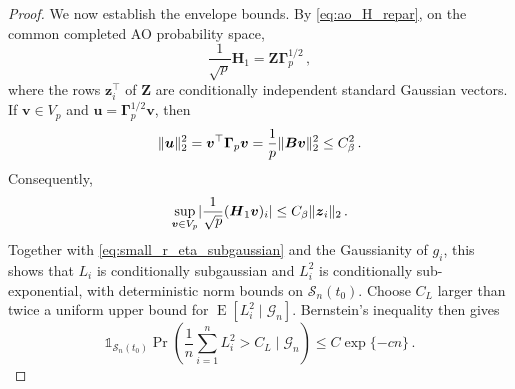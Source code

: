 \documentclass{article}
\makeatletter
\DeclareMathOperator{\expect}{E}
\theoremstyle{definition}
\newcommand{\vnorm}[1]{%
	\ensuremath{%
		\if@display
		\left\| #1 \right\|
		\else
		\| #1 \|
		\fi
	}%
}
\newcommand{\abs}[1]{%
	\ensuremath{%
		\if@display
		\left| #1 \right|
		\else
		\lvert #1 \rvert
		\fi
	}%
}
\newcommand*{\bb}{\boldsymbol}
\def\bH {\bb{H}}
\def\bu{\bb{u}}
\def\bv{\bb{v}}
\def\bz{\bb{z}}
\def\bH{\bb{H}}
\makeatother
\begin{document}
\begin{bibunit}
\begin{proof}
We now establish the envelope bounds. By \eqref{eq:ao_H_repar}, on the
common completed AO probability space,
$$
	\frac1{\sqrt p}\bH_1
	=
	\bb Z\bb\Gamma_p^{1/2}\,,
$$
where the rows $\bz_i^\top$ of $\bb Z$ are conditionally independent
standard Gaussian vectors. If $\bv\in V_p$ and
$\bu=\bb\Gamma_p^{1/2}\bv$, then
$$
	\vnorm{\bu}_2^2
	=
	\bv^\top\bb\Gamma_p\bv
	=
	\frac1p\vnorm{\bb B\bv}_2^2
	\leq
	C_\beta^2\,.
$$
Consequently,
\begin{equation}
\label{eq:small_r_signal_envelope}
	\underset{\bv\in V_p}{\sup}
	\abs{
		\frac1{\sqrt p}(\bH_1\bv)_i
	}
	\leq
	C_\beta\vnorm{\bz_i}_2 \,.
\end{equation}
Together with \eqref{eq:small_r_eta_subgaussian} and the Gaussianity of
$g_i$, this shows that $L_i$ is conditionally subgaussian and $L_i^2$ is
conditionally sub-exponential, with deterministic norm bounds on
$\mathcal S_n(t_0)$. Choose $C_L$ larger than twice a uniform upper bound
for $\expect[L_i^2\mid\mathcal G_n]$. Bernstein's inequality \citep[Theorem~2.8.1]{vershynin:2018} then gives
\begin{equation}
\label{eq:small_r_envelope_energy_probability}
	\mathds{1}_{\mathcal S_n(t_0)}
	\Pr\left(
		\frac1n\sum_{i=1}^nL_i^2>C_L
		\mid
		\mathcal G_n
	\right)
	\leq
	C\exp\{-cn\} \,.
\end{equation}


\end{proof}
\end{bibunit}
\end{document}

